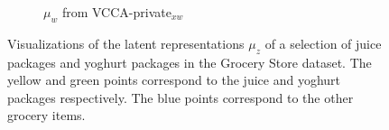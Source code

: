 \begin{figure}[!tp]
\begin{subfigure}[b]{0.7\textwidth}
         \caption{$\mu_{w}$ from VCCA-private$_{x w}$}
         \label{fig:pca_vcca_private_xw_uw}
     \end{subfigure} 
    \caption{Visualizations of the latent representations $\mu_{z}$ of a selection of juice packages and yoghurt packages in the Grocery Store dataset. The yellow and green points correspond to the juice and yoghurt packages respectively. The blue points correspond to the other grocery items. 
    }
    \label{fig:2d_visualizations_pca_vcca_private_xw}
\end{figure}